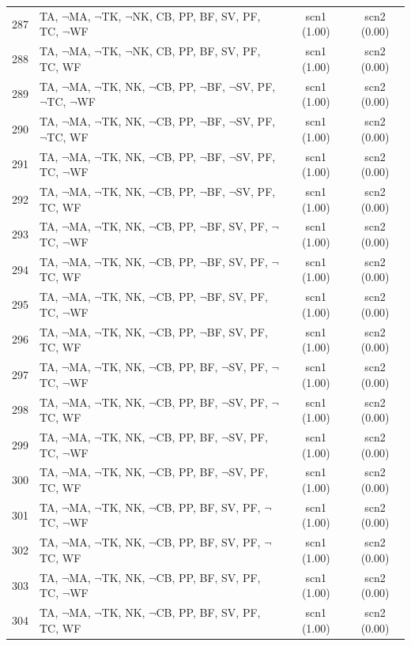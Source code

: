\documentclass[12pt]{article}
\begin{document}
\begin{longtable}{|l|l|c|c|}
287 & TA, $\neg$MA, $\neg$TK, $\neg$NK, CB, PP, BF, SV, PF, TC, $\neg$WF & scn1 (1.00) & scn2 (0.00)\\
288 & TA, $\neg$MA, $\neg$TK, $\neg$NK, CB, PP, BF, SV, PF, TC, WF & scn1 (1.00) & scn2 (0.00)\\
289 & TA, $\neg$MA, $\neg$TK, NK, $\neg$CB, PP, $\neg$BF, $\neg$SV, PF, $\neg$TC, $\neg$WF & scn1 (1.00) & scn2 (0.00)\\
290 & TA, $\neg$MA, $\neg$TK, NK, $\neg$CB, PP, $\neg$BF, $\neg$SV, PF, $\neg$TC, WF & scn1 (1.00) & scn2 (0.00)\\
291 & TA, $\neg$MA, $\neg$TK, NK, $\neg$CB, PP, $\neg$BF, $\neg$SV, PF, TC, $\neg$WF & scn1 (1.00) & scn2 (0.00)\\
292 & TA, $\neg$MA, $\neg$TK, NK, $\neg$CB, PP, $\neg$BF, $\neg$SV, PF, TC, WF & scn1 (1.00) & scn2 (0.00)\\
293 & TA, $\neg$MA, $\neg$TK, NK, $\neg$CB, PP, $\neg$BF, SV, PF, $\neg$TC, $\neg$WF & scn1 (1.00) & scn2 (0.00)\\
294 & TA, $\neg$MA, $\neg$TK, NK, $\neg$CB, PP, $\neg$BF, SV, PF, $\neg$TC, WF & scn1 (1.00) & scn2 (0.00)\\
295 & TA, $\neg$MA, $\neg$TK, NK, $\neg$CB, PP, $\neg$BF, SV, PF, TC, $\neg$WF & scn1 (1.00) & scn2 (0.00)\\
296 & TA, $\neg$MA, $\neg$TK, NK, $\neg$CB, PP, $\neg$BF, SV, PF, TC, WF & scn1 (1.00) & scn2 (0.00)\\
297 & TA, $\neg$MA, $\neg$TK, NK, $\neg$CB, PP, BF, $\neg$SV, PF, $\neg$TC, $\neg$WF & scn1 (1.00) & scn2 (0.00)\\
298 & TA, $\neg$MA, $\neg$TK, NK, $\neg$CB, PP, BF, $\neg$SV, PF, $\neg$TC, WF & scn1 (1.00) & scn2 (0.00)\\
299 & TA, $\neg$MA, $\neg$TK, NK, $\neg$CB, PP, BF, $\neg$SV, PF, TC, $\neg$WF & scn1 (1.00) & scn2 (0.00)\\
300 & TA, $\neg$MA, $\neg$TK, NK, $\neg$CB, PP, BF, $\neg$SV, PF, TC, WF & scn1 (1.00) & scn2 (0.00)\\
301 & TA, $\neg$MA, $\neg$TK, NK, $\neg$CB, PP, BF, SV, PF, $\neg$TC, $\neg$WF & scn1 (1.00) & scn2 (0.00)\\
302 & TA, $\neg$MA, $\neg$TK, NK, $\neg$CB, PP, BF, SV, PF, $\neg$TC, WF & scn1 (1.00) & scn2 (0.00)\\
303 & TA, $\neg$MA, $\neg$TK, NK, $\neg$CB, PP, BF, SV, PF, TC, $\neg$WF & scn1 (1.00) & scn2 (0.00)\\
304 & TA, $\neg$MA, $\neg$TK, NK, $\neg$CB, PP, BF, SV, PF, TC, WF & scn1 (1.00) & scn2 (0.00)\\

\end{longtable}
\end{document}
